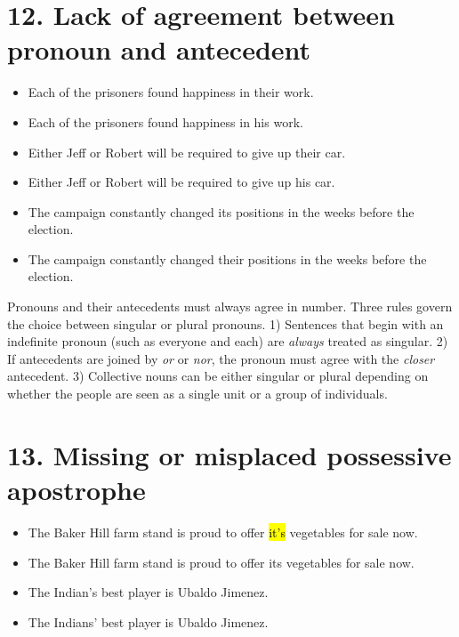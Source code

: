 \section{12. Lack of agreement between pronoun and antecedent}

\begin{itemize}
\item Each of the prisoners found happiness in their work. 

\item Each of the prisoners found happiness in his work. 
\medskip
\item Either Jeff or Robert will be required to give up their car. 

\item Either Jeff or Robert will be required to give up his car. 
\medskip
\item The campaign constantly changed its positions in the weeks before the election. 

\item The campaign constantly changed their positions in the weeks before the election. 
\end{itemize}

\noindent Pronouns and their antecedents must always agree in number. Three 
rules govern the choice between singular or plural pronouns. 1) Sentences that begin
with an indefinite pronoun (such as everyone and each) are \emph{always}
treated as singular. 2) If antecedents are joined by \emph{or} or \emph{nor}, 
the pronoun must agree with the \emph{closer} antecedent. 3) Collective nouns can be either 
singular or plural depending on whether the people are seen as a single unit or a 
group of individuals.

\section{13. Missing or misplaced possessive apostrophe} 

\begin{itemize}
\item The Baker Hill farm stand is proud to offer \hl{it's} vegetables for sale now. 

\item The Baker Hill farm stand is proud to offer its vegetables for sale now. 
\medskip
\item The Indian's best player is Ubaldo Jimenez. 

\item The Indians' best player is Ubaldo Jimenez. 
\end{itemize}

